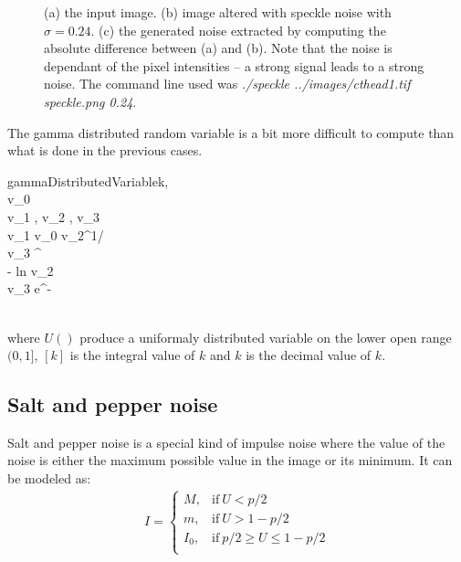 \documentclass{InsightArticle}
\begin{document}
\begin{figure}[htbp]
\begin{center}
\caption{(a) the input image. (b) image altered with speckle noise with $\sigma = 0.24$.
(c) the generated noise extracted by computing the absolute difference between (a)
and (b). Note that the noise is dependant of the pixel intensities -- a strong signal leads to a
strong noise. The command line used was {\em ./speckle ../images/cthead1.tif speckle.png 0.24}.}
\end{center}
\end{figure}

The gamma distributed random variable is a bit more difficult to compute than what is done in the
previous cases.

\begin{pseudocode}{gammaDistributedVariable}{k, \theta}
\delta {} \\
v_0 \GETS {} \\
\REPEAT
\BEGIN
  v_1 \GETS {}, v_2 \GETS {}, v_3 \GETS {} \\
  \IF v_1 \leq v_0
  \THEN
    \BEGIN
    \xi \GETS v_2^{1/\delta} \\
    \nu \GETS v_3 \xi^{} \\
    \END
  \ELSE
    \BEGIN
    \xi {} - ln v_2 \\
    \nu \GETS v_3 e^{-\xi} \\
  \END
\END
{} \\
\end{pseudocode}

where $U()$ produce a uniformaly distributed variable on the lower open range $(0, 1]$, $[k]$ is the
integral value of $k$ and ${k}$ is the decimal value of $k$.

\subsection{Salt and pepper noise}

Salt and pepper noise is a special kind of impulse noise where the value of the noise is either
the maximum possible value in the image or its minimum. It can be modeled as:
\begin{eqnarray}
\label{eq:sp}
I = 
\begin{cases} 
  M,  & \text{if}~ U < p/2 \\
  m,  & \text{if}~ U > 1 - p/2 \\
  I_0,& \text{if}~ p/2 \geq U \leq 1 - p/2 \\
\end{cases}
\end{eqnarray}
\end{document}
